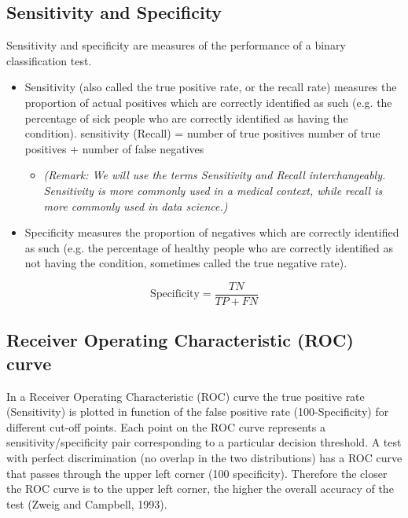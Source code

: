 \documentclass[12pt]{article}
\begin{document}
\subsection*{Sensitivity and Specificity}
Sensitivity and specificity are measures of the performance of a binary classification
test.
\begin{itemize}
\item Sensitivity (also called the true positive rate, or the recall rate) measures
the proportion of actual positives which are correctly identified
as such (e.g. the percentage of sick people who are correctly identified
as having the condition).
sensitivity (Recall) = number of true positives
number of true positives + number of false negatives
\begin{itemize}
	\item \textit{(Remark: We will use the terms Sensitivity and Recall interchangeably.
	Sensitivity is more commonly used in a medical context, while recall is more
	commonly used in data science.)}
\end{itemize}
\item Specificity measures the proportion of negatives which are correctly
identified as such (e.g. the percentage of healthy people who are correctly
identified as not having the condition, sometimes called the true
negative rate).
\end{itemize}
\[ \mbox{Specificity} = \frac{TN}{TP +FN}\]


\subsection*{Receiver Operating Characteristic (ROC) curve}
In a Receiver Operating Characteristic (ROC) curve the true positive rate
(Sensitivity) is plotted in function of the false positive rate (100-Specificity)
for different cut-off points. Each point on the ROC curve represents a sensitivity/specificity
pair corresponding to a particular decision threshold. A
test with perfect discrimination (no overlap in the two distributions) has a
ROC curve that passes through the upper left corner (100%
specificity). Therefore the closer the ROC curve is to the upper left corner,
the higher the overall accuracy of the test (Zweig and Campbell, 1993).
\end{document}
